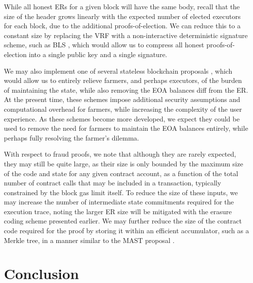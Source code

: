 \documentclass[conference]{IEEEtran}
\begin{document}
While all honest ERs for a given block will have the same body, recall that the size of the header grows linearly with the expected number of elected executors for each block, due to the additional proofs-of-election. We can reduce this to a constant size by replacing the VRF with a non-interactive deterministic signature scheme, such as BLS \cite{boneh2004short}, which would allow us to compress all honest proofs-of-election into a single public key and a single signature.

We may also implement one of several stateless blockchain proposals \cite{boneh2019batching, tomescu2020aggregatable, agrawal2020kvac}, which would allow us to entirely relieve farmers, and perhaps executors, of the burden of maintaining the state, while also removing the EOA balances diff from the ER. At the present time, these schemes impose additional security assumptions and computational overhead for farmers, while increasing the complexity of the user experience. As these schemes become more developed, we expect they could be used to remove the need for farmers to maintain the EOA balances entirely, while perhaps fully resolving the farmer’s dilemma.

With respect to fraud proofs, we note that although they are rarely expected, they may still be quite large, as their size is only bounded by the maximum size of the code and state for any given contract account, as a function of the total number of contract calls that may be included in a transaction, typically constrained by the block gas limit itself. To reduce the size of these inputs, we may increase the number of intermediate state commitments required for the execution trace, noting the larger ER size will be mitigated with the erasure coding scheme presented earlier. We may further reduce the size of the contract code required for the proof by storing it within an efficient accumulator, such as a Merkle tree, in a manner similar to the MAST proposal \cite{rubin2014merkelized}. 

\section{Conclusion}
\end{document}
